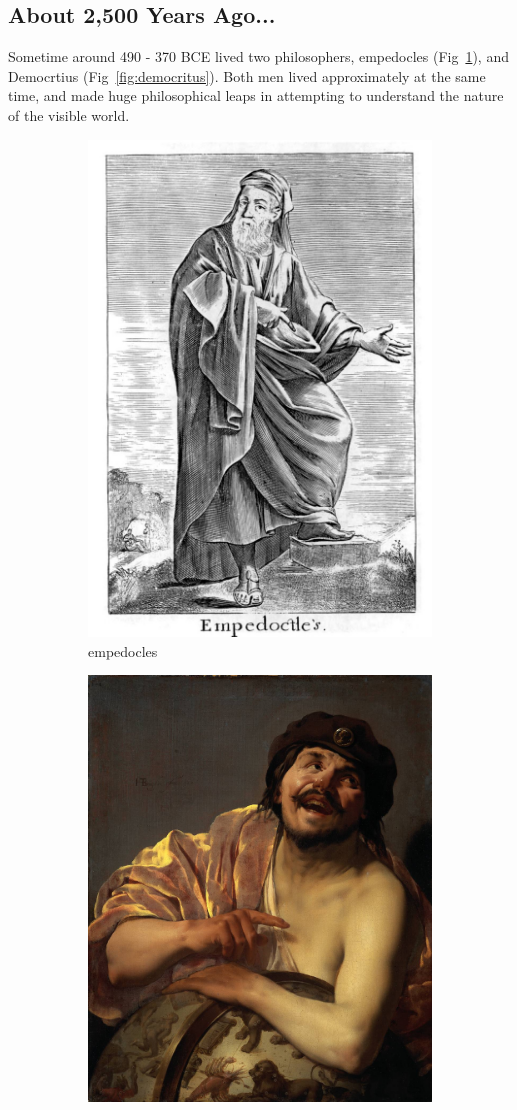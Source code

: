 \subsection{About 2,500 Years Ago...}
Sometime around 490 - 370 BCE lived two philosophers, empedocles
(Fig~\ref{fig:empedocles}), and Democrtius (Fig~\ref{fig:democritus}). Both men
lived approximately at the same time, and made huge philosophical leaps in
attempting to understand the nature of the visible world.

\begin{figure}[H]
	\centering
	\begin{subfigure}{.5\textwidth}
		\centering
		\includegraphics[width=0.7\linewidth]{../Chapter2/fig/empedocles.jpg}
		\caption{empedocles}
		\label{fig:empedocles}
	\end{subfigure}%
	\begin{subfigure}{0.5\textwidth}
		\centering
		\includegraphics[width=0.7\linewidth]{../Chapter2/fig/democritus.jpg}

\end{subfigure}
\end{figure}
